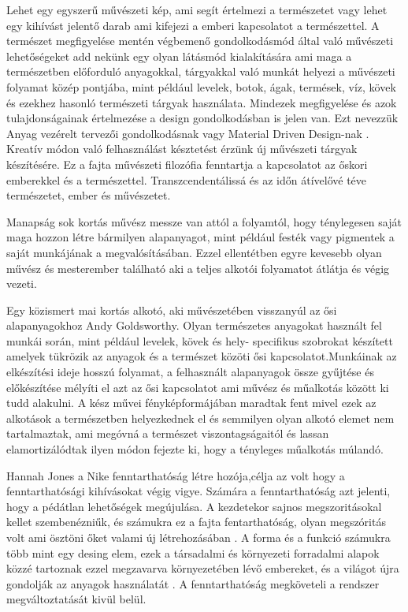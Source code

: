 
Lehet egy egyszerű művészeti kép, ami segít értelmezi a természetet vagy lehet egy kihívást jelentő darab ami kifejezi a emberi kapcsolatot a természettel.\cite{art_nature} 
A természet megfigyelése mentén végbemenő gondolkodásmód által való művészeti lehetőségeket  add nekünk egy olyan látásmód kialakítására ami maga a természetben előforduló anyagokkal, tárgyakkal való munkát helyezi a művészeti folyamat közép pontjába, mint például levelek, botok, ágak, termések, víz, kövek és ezekhez hasonló természeti tárgyak használata.
Mindezek megfigyelése és azok tulajdonságainak értelmezése a design gondolkodásban is jelen van. Ezt nevezzük Anyag vezérelt tervezői gondolkodásnak vagy Material Driven Design-nak \cite{karana2015material}.
Kreatív módon való felhasználást késztetést érzünk új művészeti tárgyak készítésére.
\cite{meller2002textile}
Ez a fajta művészeti filozófia fenntartja a kapcsolatot az őskori emberekkel és a természettel. Transzcendentálissá és az időn átívelővé téve természetet, ember és művészetet.

Manapság sok kortás művész messze van attól a folyamtól, hogy ténylegesen saját maga hozzon létre bármilyen alapanyagot, mint például festék vagy pigmentek a saját munkájának a megvalósításában. Ezzel ellentétben egyre kevesebb olyan művész és mesterember található aki a teljes alkotói folyamatot átlátja és végig vezeti.

\vspace{2 mm}
Egy közismert mai kortás alkotó, aki művészetében visszanyúl az ősi alapanyagokhoz Andy Goldsworthy. Olyan természetes anyagokat használt fel munkái során, mint például levelek, kövek és hely- specifikus szobrokat készített amelyek tükrözik az anyagok és a természet közöti ősi kapcsolatot.Munkáinak az elkészítési ideje hosszú folyamat, a felhasznált  alapanyagok össze gyűjtése és előkészítése mélyíti el azt az ősi kapcsolatot ami művész és műalkotás között ki tudd alakulni.
A kész művei fényképformájában maradtak fent mivel ezek az alkotások a természetben helyezkednek el és semmilyen olyan alkotó elemet nem tartalmaztak, ami megóvná a természet viszontagságaitól és lassan elamortizálódtak ilyen módon fejezte ki, hogy a tényleges műalkotás múlandó.

\vspace{2 mm}
Hannah Jones a Nike fenntarthatóság \cite{nike} létre hozója,célja az volt hogy a fenntarthatósági kihívásokat végig vigye. 
Számára a fenntarthatóság azt jelenti, hogy a pédátlan lehetőségek megújulása.
A kezdetekor sajnos megszoritásokal kellet szembenézniűk, és számukra ez a fajta fentarthatóság, olyan megszóritás volt ami ösztöni őket valami új létrehozásában .
 A forma és a funkció számukra több mint egy desing elem, ezek a társadalmi és környezeti forradalmi alapok közzé tartoznak ezzel megzavarva környezetében lévő embereket, és a világot újra gondolják az anyagok használatát .
A fenntarthatóság megköveteli a rendszer megváltoztatását kivül belül.

